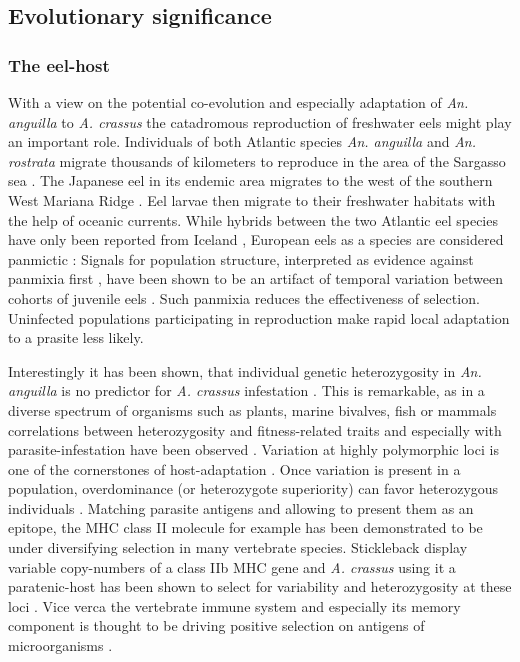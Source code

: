 \subsection{Evolutionary significance}
\label{ev-sig}

\subsubsection{The eel-host}
\label{sec:eel-host}

With a view on the potential co-evolution and especially adaptation of
\textit{An. anguilla} to \textit{A. crassus} the catadromous
reproduction of freshwater eels might play an important
role. Individuals of both Atlantic species \textit{An. anguilla} and
\textit{An. rostrata} migrate thousands of kilometers to reproduce in
the area of the Sargasso sea \cite{pmid19779192}. The Japanese eel in
its endemic area migrates to the west of the southern West Mariana
Ridge \cite{pmid20735676}. Eel larvae then migrate to their freshwater
habitats with the help of oceanic currents. While hybrids between the
two Atlantic eel species have only been reported from Iceland
\cite{pmid21299662}, European eels as a species are considered
panmictic \cite{pmid20735687}: Signals for population structure,
interpreted as evidence against panmixia first \cite{pmid11234011},
have been shown to be an artifact of temporal variation between
cohorts of juvenile eels \cite{pmid19417764, pmid21299662,
  pmid16024374}. Such panmixia reduces the effectiveness of
selection. Uninfected populations participating in reproduction make
rapid local adaptation to a prasite less likely.

Interestingly it has been shown, that individual genetic
heterozygosity in \textit{An. anguilla} is no predictor for
\textit{A. crassus} infestation \cite{pmid19840264}. This is
remarkable, as in a diverse spectrum of organisms such as plants,
marine bivalves, fish or mammals correlations between heterozygosity
and fitness-related traits and especially with parasite-infestation
have been observed \cite{pmid16262866,pmid18398424}. Variation at
highly polymorphic loci is one of the cornerstones of host-adaptation
\cite{pmid20078764}. Once variation is present in a population,
overdominance (or heterozygote superiority) can favor heterozygous
individuals \cite{pmid19129114,pmid17603099}. Matching parasite
antigens and allowing to present them as an epitope, the MHC class II
molecule for example has been demonstrated to be under diversifying
selection in many vertebrate species. Stickleback display variable
copy-numbers of a class IIb MHC gene and \textit{A. crassus} using it
a paratenic-host has been shown to select for variability and
heterozygosity at these loci \cite{wegner_parasite_2003}. Vice verca
the vertebrate immune system and especially its memory component is
thought to be driving positive selection on antigens of microorganisms
\cite{conway_measuring_2002}.

